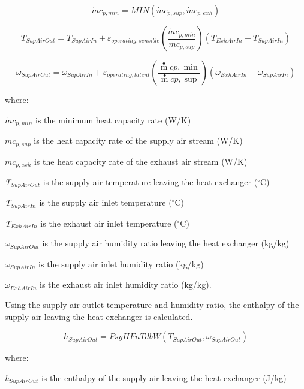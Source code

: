 \begin{equation}
{\dot{m} c_{p,min}} = MIN({\dot{m} c_{p,sup}},{\dot{m} c_{p,exh}})
\end{equation}

\begin{equation}
{T_{SupAirOut}} = {T_{SupAirIn}} + {\varepsilon_{operating,sensible}}\left( {\frac{\dot{m} c_{p,min}}{\dot{m} c_{p,sup}}} \right)({T_{ExhAirIn}} - {T_{SupAirIn}})
\end{equation}

\begin{equation}
{\omega_{SupAirOut}} = {\omega_{SupAirIn}} + {\varepsilon_{operating,latent}}\left( {\frac{{\mathop m\limits^ \bullet  cp,\min }}{{\mathop m\limits^ \bullet  cp,\sup }}} \right)({\omega_{ExhAirIn}} - {\omega_{SupAirIn}})
\end{equation}

where:

\({\dot{m} c_{p,min}}\) is the minimum heat capacity rate (W/K)

\({\dot{m} c_{p,sup}}\) is the heat capacity rate of the supply air stream (W/K)

\({\dot{m} c_{p,exh}}\) is the heat capacity rate of the exhaust air stream (W/K)

\emph{T\(_{SupAirOut}\)} is the supply air temperature leaving the heat exchanger (\(^{\circ}\)C)

\emph{T\(_{SupAirIn}\)} is the supply air inlet temperature (\(^{\circ}\)C)

\emph{T\(_{ExhAirIn}\)} is the exhaust air inlet temperature (\(^{\circ}\)C)

\({\omega_{SupAirOut}}\) is the supply air humidity ratio leaving the heat exchanger (kg/kg)

\({\omega_{SupAirIn}}\) is the supply air inlet humidity ratio (kg/kg)

\({\omega_{ExhAirIn}}\) is the exhaust air inlet humidity ratio (kg/kg).

Using the supply air outlet temperature and humidity ratio, the enthalpy of the supply air leaving the heat exchanger is calculated.

\begin{equation}
{h_{SupAirOut}} = PsyHFnTdbW({T_{SupAirOut}},{\omega_{SupAirOut}})
\end{equation}

where:

\emph{h\(_{SupAirOut}\)} is the enthalpy of the supply air leaving the heat exchanger (J/kg)

